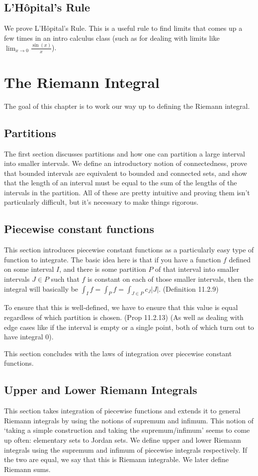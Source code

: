 \documentclass[answers,12pt]{exam}
\begin{document}
\subsection{L'H\^opital's Rule}
We prove L'H\^opital's Rule.
This is a useful rule to find limits that comes up a few times in an intro calculus class (such as for dealing with limits like $\lim_{x \to 0} \frac{\sin(x)}{x}$).

\section{The Riemann Integral}
The goal of this chapter is to work our way up to defining the Riemann integral.

\subsection{Partitions}
The first section discusses partitions and how one can partition a large interval into smaller intervals.
We define an introductory notion of connectedness, prove that bounded intervals are equivalent to bounded and connected sets, and show that the length of an interval must be equal to the sum of the lengths of the intervals in the partition.
All of these are pretty intuitive and proving them isn't particularly difficult, but it's necessary to make things rigorous.

\subsection{Piecewise constant functions}
This section introduces piecewise constant functions as a particularly easy type of function to integrate.
The basic idea here is that if you have a function $f$ defined on some interval $I$, and there is some partition $P$ of that interval into smaller intervals $J \in P$ such that $f$ is constant on each of those smaller intervals, then the integral will basically be $\int_{I} f = \int_{P} f = \int_{J \in P} c_J |J|$. (Definition 11.2.9)

To ensure that this is well-defined, we have to ensure that this value is equal regardless of which partition is chosen.
(Prop 11.2.13)
(As well as dealing with edge cases like if the interval is empty or a single point, both of which turn out to have integral 0).

This section concludes with the laws of integration over piecewise constant functions.

\subsection{Upper and Lower Riemann Integrals}
This section takes integration of piecewise functions and extends it to general Riemann integrals by using the notions of supremum and infimum.
This notion of `taking a simple construction and taking the supremum/infimum' seems to come up often: elementary sets to Jordan sets.
We define upper and lower Riemann integrals using the supremum and infimum of piecewise integrals respectively.
If the two are equal, we say that this is Riemann integrable.
We later define Riemann sums.
\end{document}
